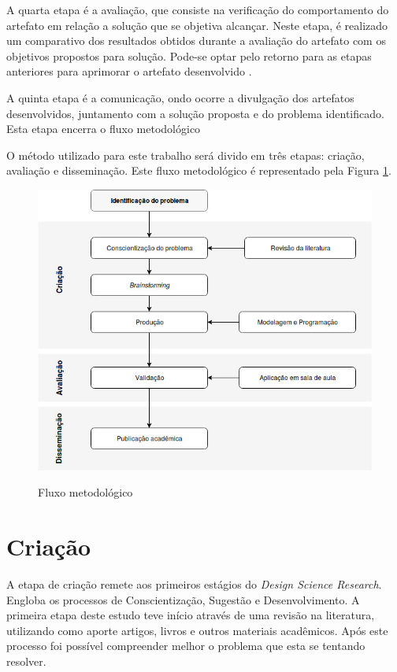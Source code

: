 \documentclass[
	12pt,				%
	oneside,			%
	a4paper,			%
	english,			%
	french,				%
	spanish,			%
	brazil,				%
	]{abntex2}
\begin{document}
A quarta etapa é a avaliação, que consiste na verificação do comportamento do artefato em relação a solução que se objetiva alcançar. Neste etapa, é realizado um comparativo dos resultados obtidos durante a avaliação do artefato com os objetivos propostos para solução. Pode-se optar pelo retorno para as etapas anteriores para aprimorar o artefato desenvolvido \cite{dresch:2015}.

A quinta etapa é a comunicação, ondo ocorre a divulgação dos artefatos desenvolvidos, juntamento com a solução proposta e do problema identificado. Esta etapa encerra o fluxo metodológico \cite{dresch:2015}

O método utilizado para este trabalho será divido em três etapas: criação, avaliação e disseminação. Este fluxo metodológico é representado pela Figura \ref{fig:fluxoMetologico}.

\begin{figure}[ht]
\centering
\caption{Fluxo metodológico}
\includegraphics[width=1\textwidth]{imagens/dsr.jpg}
\label{fig:fluxoMetologico}
\sourceAuthor
\end{figure}

\section{Criação}

A etapa de criação remete aos primeiros estágios do \textit{Design Science Research}. Engloba os processos de Conscientização, Sugestão  e Desenvolvimento. A primeira etapa deste estudo teve início através de uma revisão na literatura, utilizando como aporte artigos, livros e outros materiais acadêmicos. Após este processo foi possível compreender melhor o problema que esta se tentando resolver.
\end{document}
